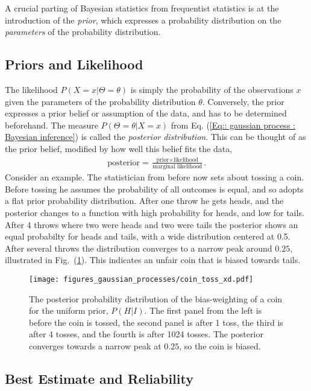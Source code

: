 \documentclass[twoside,english]{uiofysmaster}
\begin{document}
A crucial parting of Bayesian statistics from frequentist statistics is at the introduction of the \textit{prior}, which expresses a probability distribution on the \textit{parameters} of the probability distribution.

\subsection{Priors and Likelihood}

The likelihood $P(X = x |\Theta = \theta)$ is simply the probability of the observations $x$ given the parameters of the probability distribution $\theta$. Conversely, the prior expresses a prior belief or assumption of the data, and has to be determined beforehand. The measure $P(\Theta = \theta | X = x)$ from Eq. (\ref{Eq:: gaussian process : Bayesian inference}) is called the \textit{posterior distribution}. This can be thought of as the prior belief, modified by how well this belief fits the data,
\begin{align*}
\text{posterior} = \frac{\text{prior} \times \text{likelihood}}{\text{marginal likelihood}}.
\end{align*}
Consider an example. The statistician from before now sets about tossing a coin. Before tossing he assumes the probability of all outcomes is equal, and so adopts a flat prior probability distribution. After one throw he gets heads, and the posterior changes to a function with high probability for heads, and low for tails. After 4 throws where two were heads and two were tails the posterior shows an equal probabilty for heads and tails, with a wide distribution centered at 0.5. After several throws the distribution converges to a narrow peak around $0.25$, illustrated in Fig.\ (\ref{Fig:: gaussian process : Dice throw }). This indicates an unfair coin that is biased towards tails.

\begin{figure}
\texttt{[image: figures\_gaussian\_processes/coin\_toss\_xd.pdf]}
\caption{The posterior probability distribution of the bias-weighting of a coin for the uniform prior, $P(H|I)$. The first panel from the left is before the coin is tossed, the second panel is after 1 toss, the third is after 4 tosses, and the fourth is after 1024 tosses. The posterior converges towards a narrow peak at $0.25$, so the coin is biased.}
\label{Fig:: gaussian process : Dice throw }
\end{figure}


\subsection{Best Estimate and Reliability}
\end{document}
